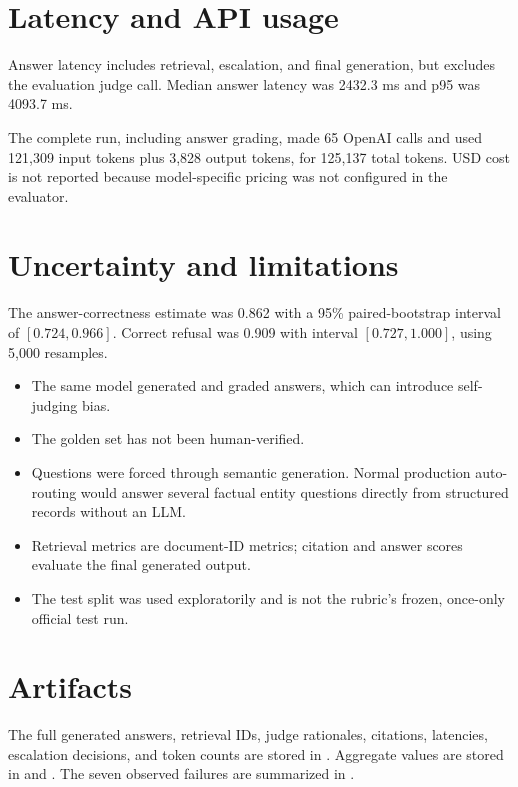\documentclass[11pt]{article}
\begin{document}
\section{Latency and API usage}

Answer latency includes retrieval, escalation, and final generation, but
excludes the evaluation judge call. Median answer latency was 2432.3 ms and
p95 was 4093.7 ms.

The complete run, including answer grading, made 65 OpenAI calls and used
121,309 input tokens plus 3,828 output tokens, for 125,137 total tokens. USD
cost is not reported because model-specific pricing was not configured in the
evaluator.

\section{Uncertainty and limitations}

The answer-correctness estimate was 0.862 with a 95\% paired-bootstrap interval
of $[0.724, 0.966]$. Correct refusal was 0.909 with interval
$[0.727, 1.000]$, using 5,000 resamples.

\begin{itemize}
  \item The same model generated and graded answers, which can introduce
        self-judging bias.
  \item The golden set has not been human-verified.
  \item Questions were forced through semantic generation. Normal production
        auto-routing would answer several factual entity questions directly
        from structured records without an LLM.
  \item Retrieval metrics are document-ID metrics; citation and answer scores
        evaluate the final generated output.
  \item The test split was used exploratorily and is not the rubric's frozen,
        once-only official test run.
\end{itemize}

\section{Artifacts}

The full generated answers, retrieval IDs, judge rationales, citations,
latencies, escalation decisions, and token counts are stored in
. Aggregate values are stored in
 and .
The seven observed failures are summarized in
.
\end{document}
